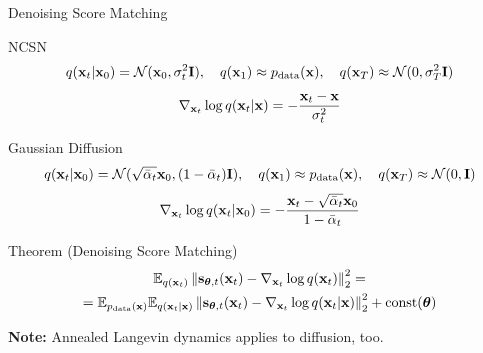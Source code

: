 \documentclass{beamer}
\begin{document}
\begin{frame}{Denoising Score Matching}
	\begin{block}{NCSN}
		\vspace{-0.7cm} 
		\[
			q(\mathbf{x}_t | \mathbf{x}_0) = \mathcal{N}(\mathbf{x}_0, \sigma_t^2 \mathbf{I}), \quad q(\mathbf{x}_1) \approx p_{\text{data}}(\mathbf{x}), \quad q(\mathbf{x}_T) \approx \mathcal{N}(0, \sigma_T^2 \mathbf{I})
		\]
		\[
			\nabla_{\mathbf{x}_t} \log q(\mathbf{x}_t | \mathbf{x}) = - \frac{\mathbf{x}_t - \mathbf{x}}{\sigma_t^2}
		\]
		\vspace{-0.6cm} 
	\end{block}
	\vspace{-0.2cm}
    \eqpause
	\begin{block}{Gaussian Diffusion}
		\vspace{-0.7cm} 
		\[
			q(\mathbf{x}_t | \mathbf{x}_0) = \mathcal{N}(\sqrt{\bar{\alpha}_t} \mathbf{x}_0, (1 - \bar{\alpha}_t) \mathbf{I}), \quad q(\mathbf{x}_1) \approx p_{\text{data}}(\mathbf{x}), \quad q(\mathbf{x}_T) \approx \mathcal{N}(0, \mathbf{I})
		\]
		\[
			\nabla_{\mathbf{x}_t} \log q(\mathbf{x}_t | \mathbf{x}_0) = - \frac{\mathbf{x}_t - \sqrt{\bar{\alpha}_t} \mathbf{x}_0}{1 - \bar{\alpha}_t}
		\]
		\vspace{-0.6cm} 
	\end{block}
	\vspace{-0.2cm}
    \eqpause
	\begin{block}{Theorem (Denoising Score Matching)}
		\vspace{-0.7cm}
		\begin{multline*}
			\mathbb{E}_{q(\mathbf{x}_t)}\left\| \mathbf{s}_{\boldsymbol{\theta}, t}(\mathbf{x}_t) - \nabla_{\mathbf{x}_t} \log q(\mathbf{x}_t) \right\|_2^2 = \\
			= \mathbb{E}_{p_{\text{data}}(\mathbf{x})} \mathbb{E}_{q(\mathbf{x}_t | \mathbf{x})}\left\| \mathbf{s}_{\boldsymbol{\theta}, t}(\mathbf{x}_t) - \nabla_{\mathbf{x}_t} \log q(\mathbf{x}_t | \mathbf{x}) \right\|_2^2 + \text{const}(\boldsymbol{\theta})
		\end{multline*}
		\vspace{-0.5cm}
	\end{block}
    \eqpause
	\vspace{-0.3cm}
	\textbf{Note:} Annealed Langevin dynamics applies to diffusion, too.
\end{frame}
\end{document}
